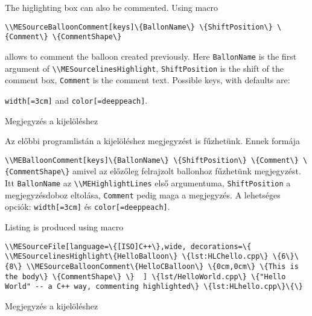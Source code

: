 {
The higlighting box can also be commented. Using macro
\par\noindent\lstinline|\\MESourceBalloonComment[keys]\{BallonName\} \{ShiftPosition\} \{Comment\} \{CommentShape\}|
\par\noindent allows to comment the balloon created previously.
Here \lstinline|BallonName| is the first argument of  \lstinline|\\MESourcelinesHighlight|,
\lstinline|ShiftPosition| is the shift of the comment box, \lstinline|Comment| is the comment text.
Possible keys, with defaults are:
\par\noindent \lstinline|width[=3cm]| and \lstinline|color[=deeppeach]|.

}
{Megjegyzés a kijelöléshez}
{
Az előbbi programlistán a kijelöléshez megjegyzést is fűzhetünk.
Ennek formája 
\par\noindent\lstinline|\\MEBalloonComment[keys]\{BallonName\} \{ShiftPosition\} \{Comment\} \{CommentShape\}|
amivel az előzőleg felrajzolt ballonhoz fűzhetünk megjegyzést.
Itt \lstinline|BallonName| az \lstinline|\\MEHighlightLines| első argumentuma,
\lstinline|ShiftPosition| a megjegyzésdoboz eltolása, \lstinline|Comment| pedig maga 
a megjegyzés.
A lehetséges opciók: \lstinline|width[=3cm]| és \lstinline|color[=deeppeach]|.

}
{
Listing \ao{\ref{lst:HLChello.cpp}} is produced using macro
\par\noindent\lstinline|\\MESourceFile[language=\{[ISO]C++\},wide,
decorations=\{
\\MESourcelinesHighlight\{HelloBalloon\} \{lst:HLChello.cpp\} \{6\}\{8\}
\\MESourceBalloonComment\{HelloCBalloon\} \{0cm,0cm\} \{This is the body\} \{CommentShape\}
\} 
] \{lst/HelloWorld.cpp\} \{"Hello World" -- a C++ way, commenting highlighted\} \{lst:HLhello.cpp\}\{\}|

}
{Megjegyzés a kijelöléshez}
